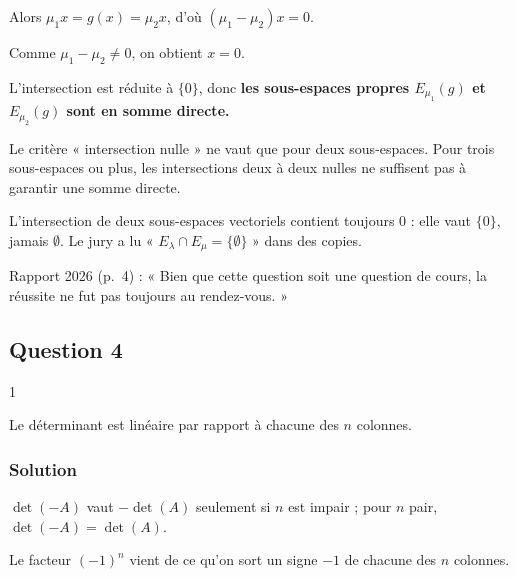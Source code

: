 \documentclass[11pt,a4paper]{article}
\providecommand{\varnothing}{\emptyset}
\newcommand{\equationajustee}[1]{%
  \sbox{\boiteequation}{$\displaystyle #1$}%
  \ifdim\wd\boiteequation>\linewidth
    \[\resizebox{\linewidth}{!}{\usebox{\boiteequation}}\]%
  \else
    \[#1\]%
  \fi}
\begin{document}
Alors \(\mu_1x=g(x)=\mu_2x\), d'où \((\mu_1-\mu_2)x=0\).

Comme \(\mu_1-\mu_2\neq0\), on obtient \(x=0\).

L'intersection est réduite à \(\{0\}\), donc \textbf{les sous-espaces propres \(E_{\mu_1}(g)\) et \(E_{\mu_2}(g)\) sont en somme directe.}

\begin{piege}

Le critère « intersection nulle » ne vaut que pour deux sous-espaces. Pour trois sous-espaces ou plus, les intersections deux à deux nulles ne suffisent pas à garantir une somme directe.

\end{piege}

\begin{piege}

L'intersection de deux sous-espaces vectoriels contient toujours \(0\) : elle vaut \(\{0\}\), jamais \(\varnothing\). Le jury a lu « \(E_\lambda\cap E_\mu=\{\varnothing\}\) » dans des copies.

\end{piege}

\begin{jury}

Rapport 2026 (p.~4) : « Bien que cette question soit une question de cours, la réussite ne fut pas toujours au rendez-vous. »

\end{jury}

\hypertarget{question-4}{%
\subsection{Question 4}\label{question-4}}

\begin{indication}{1}

Le déterminant est linéaire par rapport à chacune des \(n\) colonnes.

\end{indication}

\hypertarget{solution-3}{%
\subsubsection{Solution}\label{solution-3}}

\equationajustee{\boxed{\det(-A)=(-1)^n\det(A)}}

\equationajustee{\boxed{\det(A^\top)=\det(A)}}

\begin{piege}

\(\det(-A)\) vaut \(-\det(A)\) seulement si \(n\) est impair ; pour \(n\) pair, \(\det(-A)=\det(A)\).

Le facteur \((-1)^n\) vient de ce qu'on sort un signe \(-1\) de chacune des \(n\) colonnes.

\end{piege}
\end{document}
